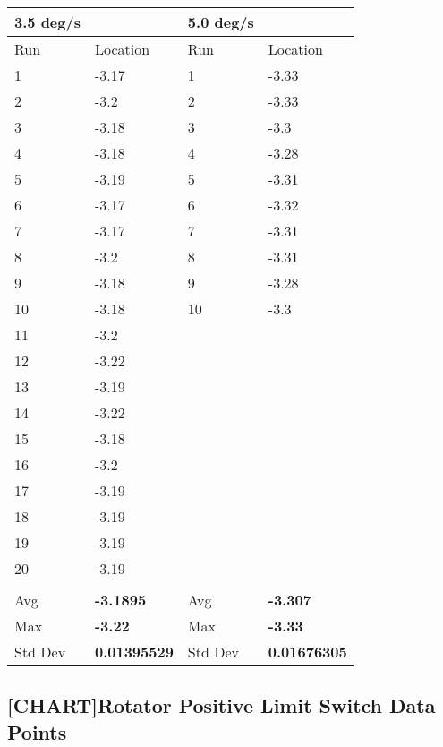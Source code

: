\documentclass[SE,lsstdraft,authoryear,toc]{lsstdoc}
\begin{document}
\begin{longtable}[]{@{}llll@{}}
\toprule
3.5 deg/s & & 5.0 deg/s & \\
\midrule
\endhead
Run & Location & Run & Location \\
1 & -3.17 & 1 & -3.33 \\
2 & -3.2 & 2 & -3.33 \\
3 & -3.18 & 3 & -3.3 \\
4 & -3.18 & 4 & -3.28 \\
5 & -3.19 & 5 & -3.31 \\
6 & -3.17 & 6 & -3.32 \\
7 & -3.17 & 7 & -3.31 \\
8 & -3.2 & 8 & -3.31 \\
9 & -3.18 & 9 & -3.28 \\
10 & -3.18 & 10 & -3.3 \\
11 & -3.2 & & \\
12 & -3.22 & & \\
13 & -3.19 & & \\
14 & -3.22 & & \\
15 & -3.18 & & \\
16 & -3.2 & & \\
17 & -3.19 & & \\
18 & -3.19 & & \\
19 & -3.19 & & \\
20 & -3.19 & & \\
& & & \\
Avg & \textbf{-3.1895} & Avg & \textbf{-3.307} \\
Max & \textbf{-3.22} & Max & \textbf{-3.33} \\
Std Dev & \textbf{0.01395529} & Std Dev & \textbf{0.01676305} \\
\bottomrule
\end{longtable}

\hypertarget{chartrotator-positive-limit-switch-data-points}{%
\subsection{\texorpdfstring{{{[}CHART{]}}Rotator Positive Limit Switch
Data
Points}{{[}CHART{]}Rotator Positive Limit Switch Data Points}}\label{chartrotator-positive-limit-switch-data-points}}
\end{document}
